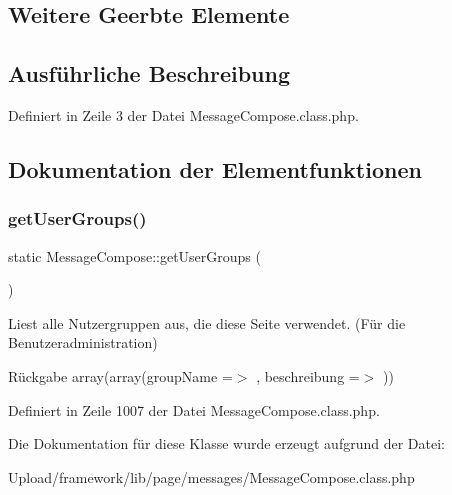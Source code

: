 \subsection*{Weitere Geerbte Elemente}


\subsection{Ausführliche Beschreibung}


Definiert in Zeile 3 der Datei Message\+Compose.\+class.\+php.



\subsection{Dokumentation der Elementfunktionen}
\mbox{\label{class_message_compose_afc0a9d9accb2d340ce3294e81167ecc3}} 
\subsubsection{\texorpdfstring{get\+User\+Groups()}{getUserGroups()}}
{\footnotesize\ttfamily static Message\+Compose\+::get\+User\+Groups (\begin{DoxyParamCaption}{ }\end{DoxyParamCaption})\hspace{0.3cm}{\ttfamily [static]}}

Liest alle Nutzergruppen aus, die diese Seite verwendet. (Für die Benutzeradministration) \begin{DoxyReturn}{Rückgabe}
array(array(\textquotesingle{}group\+Name\textquotesingle{} =$>$ \textquotesingle{}\textquotesingle{}, \textquotesingle{}beschreibung\textquotesingle{} =$>$ \textquotesingle{}\textquotesingle{})) 
\end{DoxyReturn}


Definiert in Zeile 1007 der Datei Message\+Compose.\+class.\+php.



Die Dokumentation für diese Klasse wurde erzeugt aufgrund der Datei\+:\begin{DoxyCompactItemize}
\item 
Upload/framework/lib/page/messages/Message\+Compose.\+class.\+php\end{DoxyCompactItemize}

